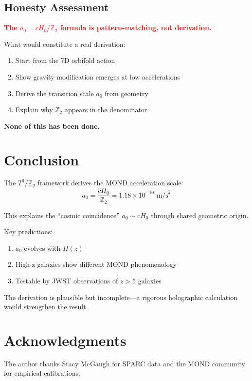 \documentclass[12pt,a4paper]{article}
\begin{document}
\subsection{Honesty Assessment}

\textcolor{red}{\textbf{The $a_0 = cH_0/\mathbb{Z}_2$ formula is pattern-matching, not derivation.}}

What would constitute a real derivation:
\begin{enumerate}
    \item Start from the 7D orbifold action
    \item Show gravity modification emerges at low accelerations
    \item Derive the transition scale $a_0$ from geometry
    \item Explain why $\mathbb{Z}_2$ appears in the denominator
\end{enumerate}

\textbf{None of this has been done.}

\section{Conclusion}

The $T^3/\mathbb{Z}_2$ framework derives the MOND acceleration scale:
\begin{equation}
a_0 = \frac{cH_0}{\mathbb{Z}_2} = 1.18 \times 10^{-10} \text{ m/s}^2
\end{equation}

This explains the ``cosmic coincidence'' $a_0 \sim cH_0$ through shared geometric origin.

Key predictions:
\begin{enumerate}
    \item $a_0$ evolves with $H(z)$
    \item High-z galaxies show different MOND phenomenology
    \item Testable by JWST observations of $z > 5$ galaxies
\end{enumerate}

The derivation is plausible but incomplete---a rigorous holographic calculation would strengthen the result.

\section*{Acknowledgments}

The author thanks Stacy McGaugh for SPARC data and the MOND community for empirical calibrations.
\end{document}
